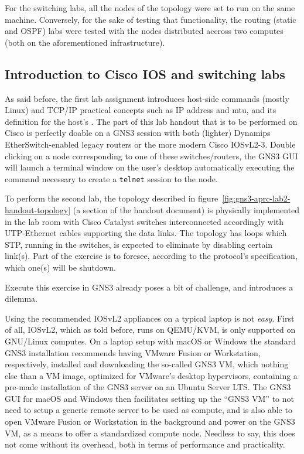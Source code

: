 For the switching labs, all the nodes of the topology were set to run on the same machine.
Conversely, for the sake of testing that functionality, the routing (static and OSPF) labs were tested with the nodes distributed accross two computes (both on the aforementioned infrastructure).



\subsection{Introduction to Cisco IOS and switching labs}
\label{subsec:gns3introswitching}

As said before, the first lab assignment introduces host-side commands (mostly Linux) and TCP/IP practical concepts such as IP address and \acrshort{mtu}, and its definition for the host's .
The part of this lab handout that is to be performed on Cisco is perfectly doable on a GNS3 session with both (lighter) Dynamips EtherSwitch-enabled legacy routers or the more modern Cisco IOSvL2-3.
Double clicking on a node corresponding to one of these switches/routers, the GNS3 GUI will launch a terminal window on the user's desktop automatically executing the command necessary to create a \texttt{telnet} session to the node.

To perform the second lab, the topology described in figure~\ref{fig:gns3-aprc-lab2-handout-topology} (a section of the handout document) is physically implemented in the lab room with Cisco Catalyst switches interconnected accordingly with UTP-Ethernet cables supporting the data links.
The topology has loops which STP, running in the switches, is expected to eliminate by disabling certain link(s).
Part of the exercise is to foresee, according to the protocol's specification, which one(s) will be shutdown.

Execute this exercise in GNS3 already poses a bit of challenge, and introduces a dilemma.

Using the recommended IOSvL2 appliances on a typical laptop is not \emph{easy}.
First of all, IOSvL2, which as told before, runs on QEMU/KVM, is only supported on GNU/Linux computes.
On a laptop setup with macOS or Windows the standard GNS3 installation recommends having VMware Fusion or Workstation, respectively, installed and downloading the so-called GNS3 VM, which nothing else than a VM image, optimized for VMware's desktop hypervisors, containing a pre-made installation of the GNS3 server on an Ubuntu Server LTS.
The GNS3 GUI for macOS and Windows then facilitates setting up the ``GNS3 VM'' to not need to setup a generic remote server to be used as compute, and is also able to open VMware Fusion or Workstation in the background and power on the GNS3 VM, as a means to offer a standardized compute node.
Needless to say, this does not come without its overhead, both in terms of performance and practicality.

